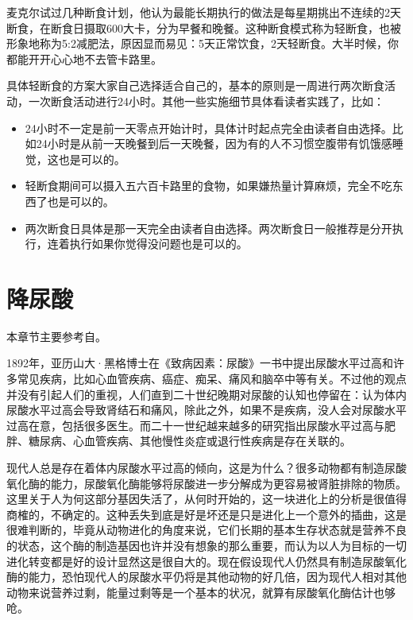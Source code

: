 \documentclass[12pt,oneside]{book}
\begin{document}
\begin{bookref}[frametitle={\cite{轻断食}}]
\begin{itemize}
\end{itemize}

麦克尔试过几种断食计划，他认为最能长期执行的做法是每星期挑出不连续的2天断食，在断食日摄取600大卡，分为早餐和晚餐。这种断食模式称为轻断食，也被形象地称为5:2减肥法，原因显而易见：5天正常饮食，2天轻断食。大半时候，你都能开开心心地不去管卡路里。

\end{bookref}

具体轻断食的方案大家自己选择适合自己的，基本的原则是一周进行两次断食活动，一次断食活动进行24小时。其他一些实施细节具体看读者实践了，比如：

\begin{itemize}
\item 24小时不一定是前一天零点开始计时，具体计时起点完全由读者自由选择。比如24小时是从前一天晚餐到后一天晚餐，因为有的人不习惯空腹带有饥饿感睡觉，这也是可以的。
\item 轻断食期间可以摄入五六百卡路里的食物，如果嫌热量计算麻烦，完全不吃东西了也是可以的。
\item 两次断食日具体是那一天完全由读者自由选择。两次断食日一般推荐是分开执行，连着执行如果你觉得没问题也是可以的。
\end{itemize}


\chapter{降尿酸}
本章节主要参考自\cite{疯狂的尿酸}。

1892年，亚历山大·黑格博士在《致病因素：尿酸》一书中提出尿酸水平过高和许多常见疾病，比如心血管疾病、癌症、痴呆、痛风和脑卒中等有关。不过他的观点并没有引起人们的重视，人们直到二十世纪晚期对尿酸的认知也停留在：认为体内尿酸水平过高会导致肾结石和痛风，除此之外，如果不是疾病，没人会对尿酸水平过高在意，包括很多医生。而二十一世纪越来越多的研究指出尿酸水平过高与肥胖、糖尿病、心血管疾病、其他慢性炎症或退行性疾病是存在关联的。

现代人总是存在着体内尿酸水平过高的倾向，这是为什么？很多动物都有制造尿酸氧化酶的能力，尿酸氧化酶能够将尿酸进一步分解成为更容易被肾脏排除的物质。这里\cite{疯狂的尿酸}关于人为何这部分基因失活了，从何时开始的，这一块进化上的分析是很值得商榷的，不确定的。这种丢失到底是好是坏还是只是进化上一个意外的插曲，这是很难判断的，毕竟从动物进化的角度来说，它们长期的基本生存状态就是营养不良的状态，这个酶的制造基因也许并没有想象的那么重要，而认为以人为目标的一切进化转变都是好的设计显然这是很自大的。现在假设现代人仍然具有制造尿酸氧化酶的能力，恐怕现代人的尿酸水平仍将是其他动物的好几倍，因为现代人相对其他动物来说营养过剩，能量过剩等是一个基本的状况，就算有尿酸氧化酶估计也够呛。
\end{document}
